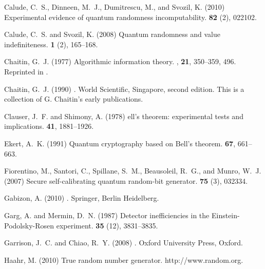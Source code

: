 \documentclass{mscs}
\begin{document}
\begin{thebibliography}{}
Calude, C.~S., Dinneen, M.~J., Dumitrescu, M., and Svozil, K. (2010)
\newblock Experimental evidence of quantum randomness incomputability.
 {\bf 82} (2), 022102.

Calude, C.~S. and Svozil, K. (2008)
\newblock Quantum randomness and value indefiniteness.
 {\bf 1} (2), 165--168.

Chaitin, G.~J. (1977)
\newblock Algorithmic information theory.
, {\bf 21}, 350--359, 496.
\newblock Reprinted in \citet{chaitin2}.

Chaitin, G.~J. (1990)
.
\newblock World Scientific, Singapore, second edition.
\newblock This is a collection of G. Chaitin's early publications.

Clauser, J.~F. and Shimony, A. (1978)
ell's theorem: experimental tests and implications.
 {\bf 41}, 1881--1926.

Ekert, A.~K. (1991)
\newblock Quantum cryptography based on {B}ell's theorem.
 {\bf 67}, 661--663.

Fiorentino, M., Santori, C., Spillane, S.~M., Beausoleil, R.~G., and Munro,
  W.~J. (2007)
\newblock Secure self-calibrating quantum random-bit generator.
 {\bf 75} (3), 032334.

Gabizon, A. (2010)
.
\newblock Springer, Berlin Heidelberg.

Garg, A. and Mermin, D.~N. (1987)
\newblock Detector inefficiencies in the {E}instein-{P}odolsky-{R}osen
  experiment.
 {\bf 35} (12), 3831--3835.

Garrison, J.~C. and Chiao, R.~Y. (2008)
.
\newblock Oxford University Press, Oxford.

Haahr, M. (2010)
\newblock True random number generator.
\newblock http://www.random.org.


\end{thebibliography}
\end{document}
